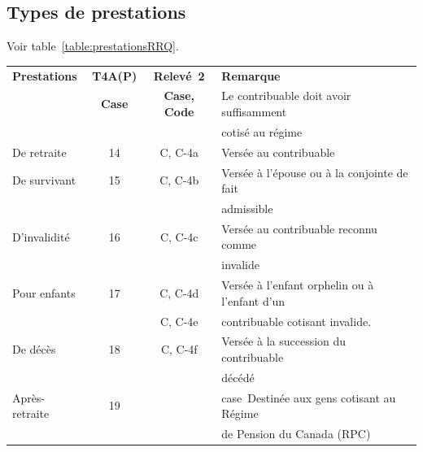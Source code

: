 \subsection{Types de prestations}
Voir table~\ref{table:prestationsRRQ}.
\begin{table}
	\centering
	\begin{tabular}{|l|c|c|l|}
		\hline
		\rowcolor{LightGreen}\multicolumn{4}{|c|}{\textbf{Prestations du RRQ}}                                       \\ \hline
		\textbf{Prestations} & \textbf{T4A(P)} &  \textbf{Relevé~2}  & \textbf{Remarque}                             \\
		                     &  \textbf{Case}  & \textbf{Case, Code} & Le contribuable doit avoir suffisamment       \\
		                     &                 &                     & cotisé au régime                              \\ \hline
		De retraite          &       14        &       C, C-4a       & Versée au contribuable                        \\ \hline
		De survivant         &       15        &       C, C-4b       & Versée à l'épouse ou à la conjointe de fait   \\
		                     &                 &                     & admissible                                    \\ \hline
		D'invalidité         &       16        &       C, C-4c       & Versée au contribuable reconnu comme          \\
		                     &                 &                     & invalide                                      \\ \hline
		Pour enfants         &       17        &    C, C-4d\up{1}    & Versée à l'enfant orphelin ou à l'enfant d'un \\
		                     &                 &       C, C-4e       & contribuable cotisant invalide.               \\ \hline
		De décès             &       18        &    C, C-4f\up{2}    & Versée à la succession du contribuable        \\
		                     &                 &                     & décédé                                        \\ \hline
		Après-retraite       &       19        &                     & case~Destinée aux gens cotisant au Régime     \\
		                     &                 &                     & de Pension du Canada (RPC)                    \\ \hline

\end{tabular}
\end{table}
